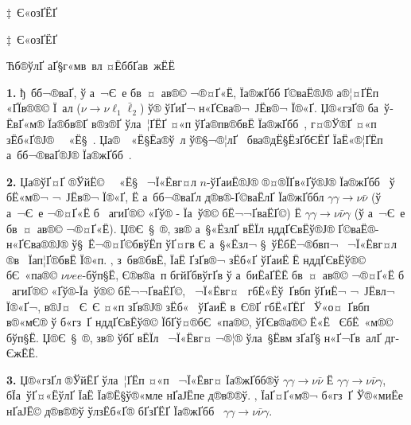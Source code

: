\begin{Slide}{‡ Є«озҐ­ЁҐ} 

\vspace*{2mm}

\centerline{\red\LARGE ‡ Є«озҐ­ЁҐ}

\vspace*{0mm}

\centerline{\darkgreen Ћб­®ў­лҐ аҐ§г«мв вл ¤ЁббҐав жЁЁ}


{\bf 1.} ђ бб¬®ваҐ­, ў а ¬Є е бв ­¤ ав­®© ¬®¤Ґ«Ё, 
Їа®жҐбб ­Ґ©ваЁ­­®Ј® а®¦¤Ґ­Ёп «ҐЇв®­­®© Ї ал ($\nu \to \nu \ell_1 \bar \ell_2$)
ў® ў­Ґи­Ґ¬ н«ҐЄва®¬ Ј­Ёв­®¬ Ї®«Ґ. 
Џ®«гзҐ­® ба ў­ЁвҐ«м­® Їа®бв®Ґ в®з­®Ґ ўла ¦Ґ­ЁҐ 
 ¤«п ўҐа®пв­®бвЁ Їа®жҐбб , г¤®Ў­®Ґ 
\newline ¤«п зЁб«Ґ­­®Ј®  ­ «Ё§ . Џа® ­ «Ё§Ёа®ў ­л ў®§¬®¦­лҐ  бва®дЁ§ЁзҐбЄЁҐ 
ЇаЁ«®¦Ґ­Ёп а бб¬®ваҐ­­®Ј® Їа®жҐбб .

{\bf 2.} Џа®ўҐ¤Ґ­ ®ЎйЁ©  ­ «Ё§  ¬Ї«Ёвг¤л $n$-ўҐаиЁ­­®Ј® ®¤­®ЇҐв«Ґў®Ј® 
 Їа®жҐбб   
ў бЁ«м­®¬ ¬ Ј­Ёв­®¬ Ї®«Ґ, Ё а бб¬®ваҐ­л д®в®­-­Ґ©ваЁ­­лҐ Їа®жҐббл
$\gamma \gamma\to \nu \bar\nu $ (ў а ¬Є е 
¬®¤Ґ«Ё б ­ агиҐ­­®© «Ґў® - Їа ў®© бЁ¬¬ҐваЁҐ©) 
Ё $\gamma \gamma \to \nu \bar\nu \gamma$ 
(ў а ¬Є е бв ­¤ ав­®© ¬®¤Ґ«Ё). 
Џ®Є § ­®, зв® а §«Ёз­лҐ вЁЇл нддҐЄвЁў­®Ј® ­Ґ©ваЁ­®-н«ҐЄва®­­®Ј® 
ў§ Ё¬®¤Ґ©бвўЁп ўҐ¤гв Є а §«Ёз­л¬ § ўЁбЁ¬®бвп¬  ¬Ї«Ёвг¤л ®в 
­ Їап¦Ґ­­®бвЁ Ї®«п. ‚ з бв­®бвЁ, ЇаЁ ­ҐзҐв­®¬ зЁб«Ґ ўҐаиЁ­ 
Ё нддҐЄвЁў­®© бЄ «па­®© $\nu\nu e e$-бўп§Ё, Є®в®а п бгйҐбвўгҐв 
ў а биЁаҐ­ЁЁ бв ­¤ ав­®© ¬®¤Ґ«Ё б ­ агиҐ­­®© «Ґў®-Їа ў®© 
бЁ¬¬ҐваЁҐ©,  ¬Ї«Ёвг¤  гбЁ«Ёў Ґвбп ў­Ґи­Ё¬ ¬ Ј­Ёв­л¬ Ї®«Ґ¬, в®Ј¤  Є Є
¤«п зҐв­®Ј® зЁб«  ўҐаиЁ­ в Є®Ґ гбЁ«Ґ­ЁҐ ­ Ў«о¤ Ґвбп в®«мЄ® ў б«гз Ґ
нддҐЄвЁў­®© ЇбҐў¤®бЄ «па­®©, ўҐЄв®а­®© Ё«Ё  ЄбЁ «м­®© бўп§Ё.   
Џ®Є § ­®, зв® ўбҐ вЁЇл  ¬Ї«Ёвг¤ ¬®¦­® ўла §Ёвм зҐаҐ§ н«Ґ¬Ґ­в а­лҐ дг­ЄжЁЁ.   

{\bf 3.} Џ®«гзҐ­л ®ЎйЁҐ ўла ¦Ґ­Ёп ¤«п  ¬Ї«Ёвг¤ Їа®жҐбб®ў 
$\gamma \gamma\to \nu \bar\nu $ Ё $\gamma \gamma \to \nu \bar\nu \gamma$,
бЇа ўҐ¤«ЁўлҐ ЇаЁ Їа®Ё§ў®«м­ле н­ҐаЈЁпе д®в®­®ў.
‚ ЇаҐ¤Ґ«м­®¬ б«гз Ґ Ў®«миЁе н­ҐаЈЁ© д®в®­®ў ўлзЁб«Ґ­® бҐзҐ­ЁҐ 
Їа®жҐбб  $\gamma \gamma \to \nu \bar\nu \gamma$. 


\end{Slide}


